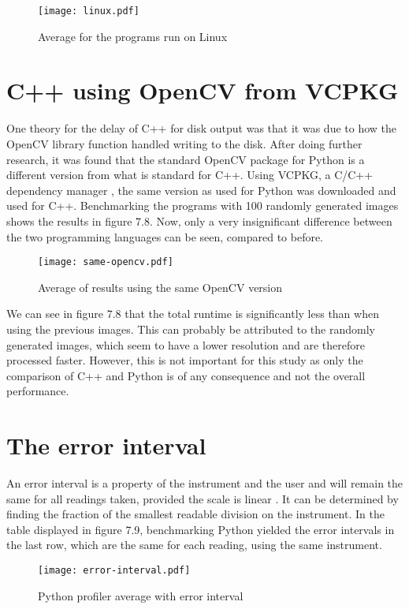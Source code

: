 \begin{figure}[H]
	\centering
	\texttt{[image: linux.pdf]}
	\caption{Average for the programs run on Linux}
	\label{figure:linux}
\end{figure}

\section{C++ using OpenCV from VCPKG}
One theory for the delay of C++ for disk output was that it was due to how the OpenCV library function handled writing to the disk. After doing further research, it was found that the standard OpenCV package for Python is a different version from what is standard for C++. Using VCPKG, a C/C++ dependency manager \cite{vcpkg}, the same version as used for Python was downloaded and used for C++. Benchmarking the programs with 100 randomly generated images shows the results in figure 7.8. Now, only a very insignificant difference between the two programming languages can be seen, compared to before.

\begin{figure}[H]
	\centering
	\texttt{[image: same-opencv.pdf]}
	\caption{Average of results using the same OpenCV version}
	\label{figure:same-opencv}
\end{figure}

We can see in figure 7.8 that the total runtime is significantly less than when using the previous images. This can probably be attributed to the randomly generated images, which seem to have a lower resolution and are therefore processed faster. However, this is not important for this study as only the comparison of C++ and Python is of any consequence and not the overall performance.

\section{The error interval}
An error interval is a property of the instrument and the user and will remain the same for all readings taken, provided the scale is linear \cite{errorinterval}. It can be determined by finding the fraction of the smallest readable division on the instrument. In the table displayed in figure 7.9, benchmarking Python yielded the error intervals in the last row, which are the same for each reading, using the same instrument.

\begin{figure}[H]
	\centering
	\texttt{[image: error-interval.pdf]}
	\caption{Python profiler average with error interval}
	\label{figure:error-interval}
\end{figure}

